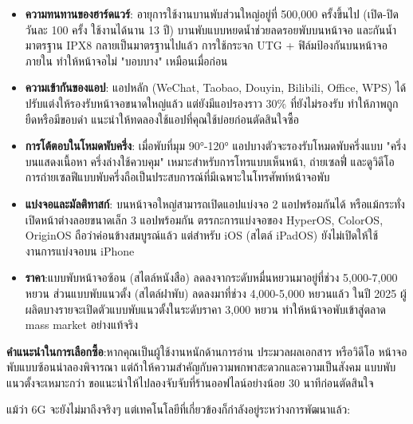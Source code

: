 \begin{itemize}
  \item \textbf{ความทนทานของฮาร์ดแวร์}: อายุการใช้งานบานพับส่วนใหญ่อยู่ที่ 500,000 ครั้งขึ้นไป (เปิด-ปิดวันละ 100 ครั้ง ใช้งานได้นาน 13 ปี) บานพับแบบหยดน้ำช่วยลดรอยพับบนหน้าจอ และกันน้ำมาตรฐาน IPX8 กลายเป็นมาตรฐานไปแล้ว การใช้กระจก UTG + ฟิล์มป้องกันบนหน้าจอภายใน ทำให้หน้าจอไม่ "บอบบาง" เหมือนเมื่อก่อน
  \item \textbf{ความเข้ากันของแอป}: แอปหลัก (WeChat, Taobao, Douyin, Bilibili, Office, WPS) ได้ปรับแต่งให้รองรับหน้าจอขนาดใหญ่แล้ว แต่ยังมีแอปรองราว 30\% ที่ยังไม่รองรับ ทำให้ภาพถูกยืดหรือมีขอบดำ แนะนำให้ทดลองใช้แอปที่คุณใช้บ่อยก่อนตัดสินใจซื้อ
  \item \textbf{การโต้ตอบในโหมดพับครึ่ง}: เมื่อพับที่มุม 90°-120° แอปบางตัวจะรองรับโหมดพับครึ่งแบบ "ครึ่งบนแสดงเนื้อหา ครึ่งล่างใช้ควบคุม" เหมาะสำหรับการโทรแบบเห็นหน้า, ถ่ายเซลฟี่ และดูวิดีโอ การถ่ายเซลฟีแบบพับครึ่งถือเป็นประสบการณ์ที่มีเฉพาะในโทรศัพท์หน้าจอพับ
  \item \textbf{แบ่งจอและมัลติทาสก์}: บนหน้าจอใหญ่สามารถเปิดแอปแบ่งจอ 2 แอปพร้อมกันได้ หรือแม้กระทั่งเปิดหน้าต่างลอยขนาดเล็ก 3 แอปพร้อมกัน ตรรกะการแบ่งจอของ HyperOS, ColorOS, OriginOS ถือว่าค่อนข้างสมบูรณ์แล้ว แต่สำหรับ iOS (สไตล์ iPadOS) ยังไม่เปิดให้ใช้งานการแบ่งจอบน iPhone
  \item \textbf{ราคา}:แบบพับหน้าจอซ้อน (สไตล์หนังสือ) ลดลงจากระดับหมื่นหยวนมาอยู่ที่ช่วง 5,000-7,000 หยวน ส่วนแบบพับแนวตั้ง (สไตล์ฝาพับ) ลดลงมาที่ช่วง 4,000-5,000 หยวนแล้ว ในปี 2025 ผู้ผลิตบางรายจะเปิดตัวแบบพับแนวตั้งในระดับราคา 3,000 หยวน ทำให้หน้าจอพับเข้าสู่ตลาด mass market อย่างแท้จริง
\end{itemize}

\textbf{คำแนะนำในการเลือกซื้อ}:หากคุณเป็นผู้ใช้งานหนักด้านการอ่าน ประมวลผลเอกสาร หรือวิดีโอ หน้าจอพับแบบซ้อนน่าลองพิจารณา แต่ถ้าให้ความสำคัญกับความพกพาสะดวกและความเป็นสังคม แบบพับแนวตั้งจะเหมาะกว่า ขอแนะนำให้ไปลองจับจับที่ร้านออฟไลน์อย่างน้อย 30 นาทีก่อนตัดสินใจ


แม้ว่า 6G จะยังไม่มาถึงจริงๆ แต่เทคโนโลยีที่เกี่ยวข้องก็กำลังอยู่ระหว่างการพัฒนาแล้ว:

